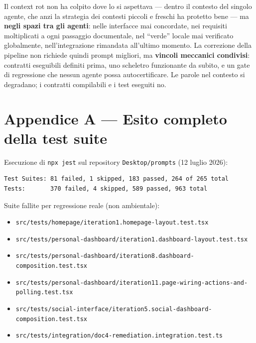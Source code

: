 \documentclass[11pt,a4paper]{article}
\newcommand{\file}[1]{\texttt{\small #1}}
\begin{document}
Il context rot non ha colpito dove lo si aspettava --- dentro il contesto del singolo agente, che anzi la strategia dei contesti piccoli e freschi ha protetto bene --- ma \textbf{negli spazi tra gli agenti}: nelle interfacce mai concordate, nei requisiti moltiplicati a ogni passaggio documentale, nel ``verde'' locale mai verificato globalmente, nell'integrazione rimandata all'ultimo momento. La correzione della pipeline non richiede quindi prompt migliori, ma \textbf{vincoli meccanici condivisi}: contratti eseguibili definiti prima, uno scheletro funzionante da subito, e un gate di regressione che nessun agente possa autocertificare. Le parole nel contesto si degradano; i contratti compilabili e i test eseguiti no.

\appendix
\newpage

\section{Appendice A --- Esito completo della test suite}

Esecuzione di \file{npx jest} sul repository \file{Desktop/prompts} (12 luglio 2026):

\begin{verbatim}
Test Suites: 81 failed, 1 skipped, 183 passed, 264 of 265 total
Tests:       370 failed, 4 skipped, 589 passed, 963 total
\end{verbatim}

Suite fallite per regressione reale (non ambientale):

\begin{itemize}[leftmargin=1.5em,itemsep=1pt]
  \item \file{src/tests/homepage/iteration1.homepage-layout.test.tsx}
  \item \file{src/tests/personal-dashboard/iteration1.dashboard-layout.test.tsx}
  \item \file{src/tests/personal-dashboard/iteration8.dashboard-composition.test.tsx}
  \item \file{src/tests/personal-dashboard/iteration11.page-wiring-actions-and-polling.test.tsx}
  \item \file{src/tests/social-interface/iteration5.social-dashboard-composition.test.tsx}
  \item \file{src/tests/integration/doc4-remediation.integration.test.ts}
\end{itemize}
\end{document}
